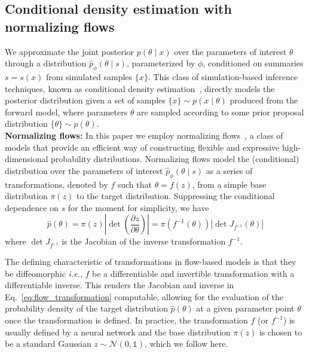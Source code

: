 \documentclass[prd,aps,10pt,nofootinbib,twocolumn,superscriptaddress,preprintnumbers,balancelastpage,longbibliography]{revtex4-1}
\begin{document}
\subsection{Conditional density estimation with normalizing flows}

We approximate the joint posterior $p(\theta\mid x)$ over the parameters of interest $\theta$ through a distribution $\hat p_\phi(\theta\mid s)$, parameterized by $\phi$, conditioned on summaries $s=s(x)$ from simulated samples $\{x\}$. This class of simulation-based inference techniques, known as conditional density estimation~\cite{papamakariosFastEpsilonFree2018}, directly models the posterior distribution given a set of samples $\{x\}\sim p(x\mid\theta)$ produced from the forward model, where parameters $\theta$ are sampled according to some prior proposal distribution $\{\theta\}\sim p(\theta)$. \\

\noindent
\textbf{Normalizing flows:}
In this paper we employ normalizing flows~\cite{papamakarios2019normalizing,rezende2015variational}, a class of models that provide an efficient way of constructing flexible and expressive high-dimensional probability distributions. Normalizing flows model the (conditional) distribution over the parameters of interest $\hat p_\phi(\theta\mid s)$ as a series of transformations, denoted by $f$ such that $\theta = f(z)$, from a simple base distribution $\pi({z})$ to the target distribution. Suppressing the conditional dependence on $s$ for the moment for simplicity, we have
\begin{equation}
    \label{eq:flow_transformation}
\hat{p}({\theta})=\pi(z)\left|\operatorname{det}\left(\frac{\partial z}{\partial {\theta}}\right)\right|=\pi(f^{-1}({\theta}))\left|\operatorname{det}J_{f^{-1}}(\theta)\right|
\end{equation}
where $\operatorname{det}J_{f^{-1}}$ is the Jacobian of the inverse transformation $f^{-1}$.

The defining characteristic of transformations in flow-based models is that they be diffeomorphic \emph{i.e.}, $f$ be a differentiable and invertible transformation with a differentiable inverse. This renders the Jacobian and inverse in Eq.~\eqref{eq:flow_transformation} computable, allowing for the evaluation of the probability density of the target distribution $\hat{p}({\theta})$ at a given parameter point $\theta$ once the transformation is defined. In practice, the transformation $f$ (or $f^{-1}$) is usually defined by a neural network and the base distribution $\pi(z)$ is chosen to be a standard Gaussian $z\sim \mathcal N(0, \mathbb{1})$, which we follow here. 
\end{document}
